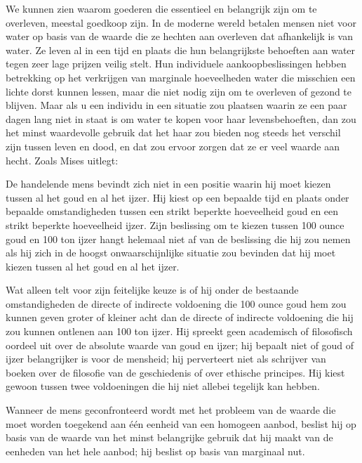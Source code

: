 We kunnen zien waarom goederen die essentieel en belangrijk zijn om te overleven, meestal goedkoop zijn. In de moderne wereld betalen mensen niet voor water op basis van de waarde die ze hechten aan overleven dat afhankelijk is van water. Ze leven al in een tijd en plaats die hun belangrijkste behoeften aan water tegen zeer lage prijzen veilig stelt. Hun individuele aankoopbeslissingen hebben betrekking op het verkrijgen van marginale hoeveelheden water die misschien een lichte dorst kunnen lessen, maar die niet nodig zijn om te overleven of gezond te blijven. Maar als u een individu in een situatie zou plaatsen waarin ze een paar dagen lang niet in staat is om water te kopen voor haar levensbehoeften, dan zou het minst waardevolle gebruik dat het haar zou bieden nog steeds het verschil zijn tussen leven en dood, en dat zou ervoor zorgen dat ze er veel waarde aan hecht. Zoals Mises uitlegt:

\begin{blockquotebox}
    De handelende mens bevindt zich niet in een positie waarin hij moet kiezen tussen al het goud en al het ijzer. Hij kiest op een bepaalde tijd en plaats onder bepaalde omstandigheden tussen een strikt beperkte hoeveelheid goud en een strikt beperkte hoeveelheid ijzer. Zijn beslissing om te kiezen tussen 100 ounce goud en 100 ton ijzer hangt helemaal niet af van de beslissing die hij zou nemen als hij zich in de hoogst onwaarschijnlijke situatie zou bevinden dat hij moet kiezen tussen al het goud en al het ijzer.

    Wat alleen telt voor zijn feitelijke keuze is of hij onder de bestaande omstandigheden de directe of indirecte voldoening die 100 ounce goud hem zou kunnen geven groter of kleiner acht dan de directe of indirecte voldoening die hij zou kunnen ontlenen aan 100 ton ijzer. Hij spreekt geen academisch of filosofisch oordeel uit over de absolute waarde van goud en ijzer; hij bepaalt niet of goud of ijzer belangrijker is voor de mensheid; hij perverteert niet als schrijver van boeken over de filosofie van de geschiedenis of over ethische principes. Hij kiest gewoon tussen twee voldoeningen die hij niet allebei tegelijk kan hebben.

    Wanneer de mens geconfronteerd wordt met het probleem van de waarde die moet worden toegekend aan één eenheid van een homogeen aanbod, beslist hij op basis van de waarde van het minst belangrijke gebruik dat hij maakt van de eenheden van het hele aanbod; hij beslist op basis van marginaal nut.\footnotemark
\end{blockquotebox}


